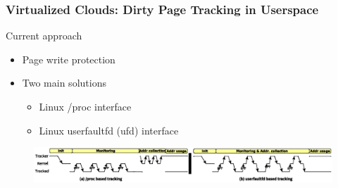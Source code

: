\documentclass[xcolor=table,bigger,unknownkeysallowed]{beamer}
\begin{document}
\begin{frame}
\frametitle{Virtualized Clouds: Dirty Page Tracking in Userspace} 
	\begin{block}{Current approach}
		\begin{itemize}
			\item Page write protection
			\item Two main solutions
			\begin{itemize}
				\item Linux /proc interface
				\item Linux userfaultfd (ufd) interface
			\end{itemize}
		\end{itemize}
	\end{block}	
	\begin{figure}
	\centering
		\includegraphics[width=1\columnwidth]{fig/solutions1}
	\end{figure}
\end{frame}

\end{document}
